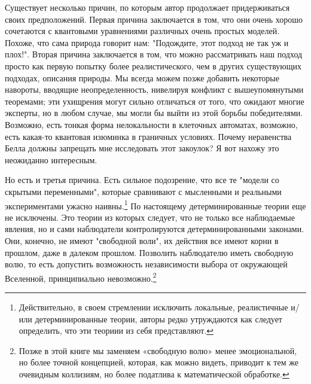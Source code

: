 \documentclass[main.tex]{subfiles}
\begin{document}
Существует несколько причин, по которым автор продолжает придерживаться своих предположений. Первая причина заключается в том, что они очень хорошо сочетаются с квантовыми уравнениями различных очень простых моделей. Похоже, что сама природа говорит нам: "Подождите, этот подход не так уж и плох!". Вторая причина заключается в том, что можно рассматривать наш подход просто как первую попытку более реалистического, чем в других существующих подходах, описания природы. Мы всегда можем позже добавить некоторые навороты, вводящие неопределенность, нивелируя конфликт с вышеупомянутыми теоремами; эти ухищрения могут сильно отличаться от того, что ожидают многие эксперты, но в любом случае, мы могли бы выйти из этой борьбы победителями. Возможно, есть тонкая форма нелокальности в клеточных автоматах, возможно, есть какая-то квантовая изюминка в граничных условиях. Почему неравенства Белла должны запрещать мне исследовать этот закоулок? Я вот нахожу это неожиданно интересным. 

Но есть и третья причина. Есть сильное подозрение, что все те "модели со скрытыми переменными", которые сравнивают с мысленными и реальными экспериментами ужасно наивны.\footnote{Действительно, в своем стремлении исключить локальные, реалистичные и/или детерминированные теории, авторы редко утруждаются как следует определить, что эти теориии из себя представляют.} По настоящему детерминированные теории еще не исключены. Это теории из которых следует, что не только все наблюдаемые явления, но и сами наблюдатели контролируются детерминированными законами. Они, конечно, не имеют "свободной воли", их действия все имеют корни в прошлом, даже в далеком прошлом. Позволить наблюдателю иметь свободную волю, то есть допустить возможность независимости выбора от окружающей Вселенной, принципиально невозможно.\footnote{Позже в этой книге мы заменяем «свободную волю» менее эмоциональной, но более точной концепцией, которая, как можно видеть, приводит к тем же очевидным коллизиям, но более податлива к математической обработке.} 
\end{document}

